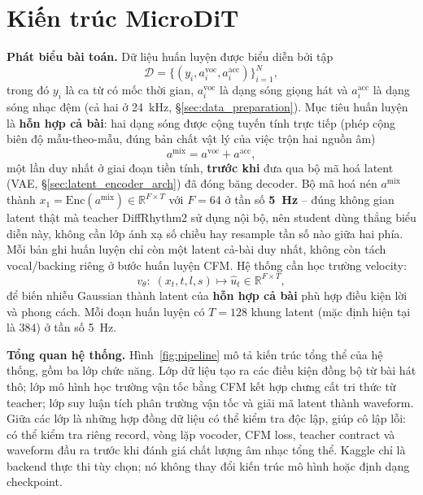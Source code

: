 \documentclass[a4paper,13pt,oneside]{report}
\begin{document}
\section{Kiến trúc MicroDiT}
\label{sec:microdit_architecture}

\textbf{Phát biểu bài toán.} Dữ liệu huấn luyện được biểu diễn bởi tập
\begin{equation}
 \mathcal{D}=\{(y_i,a_i^{\mathrm{voc}},a_i^{\mathrm{acc}})\}_{i=1}^{N},
\end{equation}
trong đó $y_i$ là ca từ có mốc thời gian, $a_i^{\mathrm{voc}}$ là dạng sóng giọng hát và $a_i^{\mathrm{acc}}$ là dạng sóng nhạc đệm (cả hai ở 24~kHz, \S\ref{sec:data_preparation}). Mục tiêu huấn luyện là \textbf{hỗn hợp cả bài}: hai dạng sóng được cộng tuyến tính trực tiếp (phép cộng biên độ mẫu-theo-mẫu, đúng bản chất vật lý của việc trộn hai nguồn âm)
\begin{equation}
 a^{\mathrm{mix}}=a^{\mathrm{voc}}+a^{\mathrm{acc}},
 \label{eq:reconstruct_full_mix}
\end{equation}
một lần duy nhất ở giai đoạn tiền tính, \textbf{trước khi} đưa qua bộ mã hoá latent (VAE, \S\ref{sec:latent_encoder_arch}) đã đóng băng decoder. Bộ mã hoá nén $a^{\mathrm{mix}}$ thành $x_1=\mathrm{Enc}(a^{\mathrm{mix}})\in\mathbb{R}^{F\times T}$ với $F=64$ ở tần số \textbf{5~Hz} -- đúng không gian latent thật mà teacher DiffRhythm2 sử dụng nội bộ, nên student dùng thẳng biểu diễn này, không cần lớp ánh xạ số chiều hay resample tần số nào giữa hai phía. Mỗi bản ghi huấn luyện chỉ còn một latent cả-bài duy nhất, không còn tách vocal/backing riêng ở bước huấn luyện CFM. Hệ thống cần học trường velocity:
\begin{equation}
 v_\theta:\;(x_t,t,l,s)\mapsto \hat{u}_t\in\mathbb{R}^{F\times T},
\end{equation}
để biến nhiễu Gaussian thành latent của \textbf{hỗn hợp cả bài} phù hợp điều kiện lời và phong cách. Mỗi đoạn huấn luyện có $T=128$ khung latent (mặc định hiện tại là $384$) ở tần số 5~Hz.

\textbf{Tổng quan hệ thống.} Hình~\ref{fig:pipeline} mô tả kiến trúc tổng thể của hệ thống, gồm
ba lớp chức năng. Lớp dữ liệu tạo ra các điều kiện đồng bộ từ bài hát thô; lớp mô hình
học trường vận tốc bằng CFM kết hợp chưng cất tri thức từ teacher; lớp suy luận tích phân
trường vận tốc và giải mã latent thành waveform. Giữa các lớp là những hợp đồng dữ liệu có
thể kiểm tra độc lập, giúp cô lập lỗi: có thể kiểm tra riêng record, vòng lặp vocoder, CFM
loss, teacher contract và waveform đầu ra trước khi đánh giá chất lượng âm nhạc tổng thể.
Kaggle chỉ là backend thực thi tùy chọn; nó không thay đổi kiến trúc mô hình hoặc định dạng
checkpoint.
\end{document}
